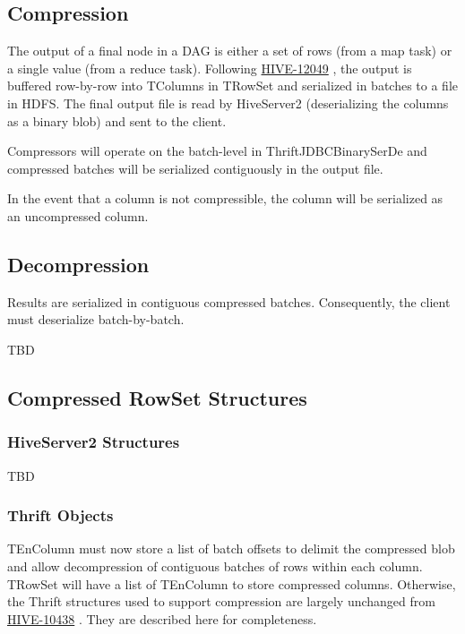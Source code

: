 \documentclass[11pt,a4paper]{article}
\begin{document}
	\subsection{Compression}
		The output of a final node in a DAG is either a set of rows (from a map task) or a single value (from a reduce task).
		Following
		\href{https://issues.apache.org/jira/browse/HIVE-12049}{HIVE-12049}
		, the output is buffered row-by-row into TColumns in TRowSet and serialized in batches to a file in HDFS.
		The final output file is read by HiveServer2 (deserializing the columns as a binary blob) and sent to the client.
		
		Compressors will operate on the batch-level in ThriftJDBCBinarySerDe and compressed batches will be serialized contiguously in the output file. 
		
		In the event that a column is not compressible, the column will be serialized as an uncompressed column.
		
	\subsection{Decompression}
		Results are serialized in contiguous compressed batches. Consequently, the client must deserialize batch-by-batch.
		
		TBD
		
	\subsection{Compressed RowSet Structures}
		\subsubsection{HiveServer2 Structures}
			TBD
		
		\subsubsection{Thrift Objects}
			TEnColumn must now store a list of batch offsets to delimit the compressed blob and allow decompression of contiguous batches of rows within each column. TRowSet will have a list of TEnColumn to store compressed columns.
			Otherwise, the Thrift structures used to support compression are largely unchanged from 
			\href{https://issues.apache.org/jira/browse/HIVE-10438}{HIVE-10438}
			. They are described here for completeness.
			
\end{document}
